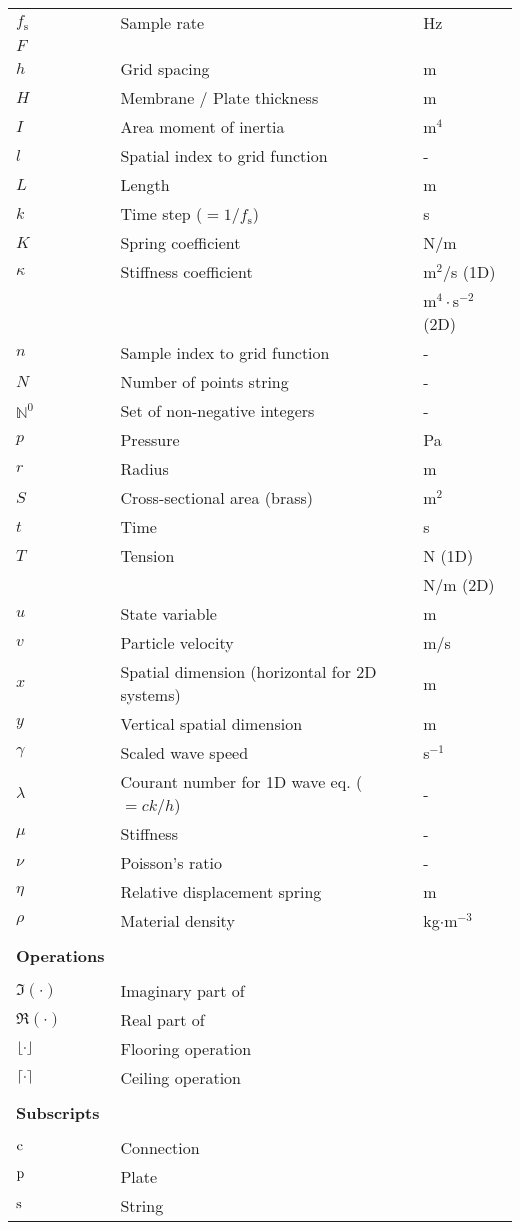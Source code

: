 {\begin{longtable}{ p{2cm} p{6.5cm} p{2.5cm}  }
 $f_\text{s}$ & Sample rate & Hz\\
 $F$ &  & \\
 $h$ & Grid spacing & m \\ 
 $H$ & Membrane / Plate thickness & m \\ 
 $I$ & Area moment of inertia & m$^4$\\
 $l$ & Spatial index to grid function & - \\
 $L$ & Length & m\\
 $k$ & Time step ($=1/f_\text{s}$) & s\\
 $K$ & Spring coefficient & N/m\\
 $\kappa$ & Stiffness coefficient & m$^2$/s (1D)\\
 & & m$^4\cdot$s$^{-2}$ (2D)\\
 $n$ & Sample index to grid function & - \\
 $N$ & Number of points string & -\\
 $\mathbb{N}^0$ & Set of non-negative integers %
 & -\\
 $p$ & Pressure & Pa\\
 $r$ & Radius & m\\
 $S$ & Cross-sectional area (brass) & m$^2$\\
 $t$ & Time & s\\
 $T$ & Tension & N (1D)\\
 & & N/m (2D)\\
 $u$ & State variable & m\\ 
 $v$ & Particle velocity & m/s\\ 
 $x$ & Spatial dimension (horizontal for 2D systems) & m\\
 $y$ & Vertical spatial dimension & m\\
 $\gamma$ & Scaled wave speed & s$^{-1}$\\
 $\lambda$ & Courant number for 1D wave eq. ($=ck/h$) & -\\
 $\mu$ & Stiffness  & -\\
 $\nu$ & Poisson's ratio & -\\
 $\eta$ & Relative displacement spring & m\\
 $\rho$ & Material density & kg$\cdot$m$^{-3}$\\
 \\
    \hline {\bf Operations}\\\hline
 \\
 $\mathfrak{I}(\cdot)$ & Imaginary part of &\\
 $\mathfrak{R}(\cdot)$ & Real part of & \\
 $\floor[\cdot]$ & Flooring operation &\\
 $\ceil[\cdot]$ & Ceiling operation &\\
 \\\hline
 {\bf Subscripts}\\\hline
 \\
 $\text{c}$ & Connection &\\
 $\text{p}$ & Plate &\\
 $\text{s}$ & String &
\end{longtable}}
